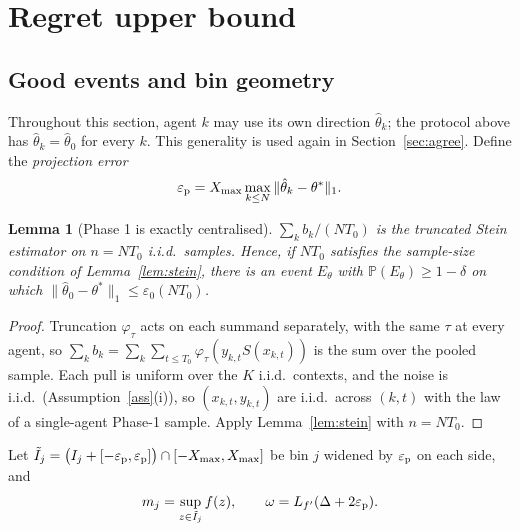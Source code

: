 \documentclass[11pt]{article}
\newtheorem{lemma}[theorem]{Lemma}
\theoremstyle{definition}
\newcommand{\Prob}{\mathbb{P}}
\newcommand{\Xmax}{X_{\max}}
\newcommand{\eps}{\varepsilon}
\begin{document}
\section{Regret upper bound}\label{sec:regret}

\subsection{Good events and bin geometry}

Throughout this section, agent $k$ may use its own direction $\hat\theta_k$; the protocol above has
$\hat\theta_k=\hat\theta_0$ for every $k$. This generality is used again in Section~\ref{sec:agree}. Define the
\emph{projection error}
\[
\eps_{\rm p}=\Xmax\max_{k\le N}\|\hat\theta_k-\theta^*\|_1 .
\]

\begin{lemma}[Phase 1 is exactly centralised]\label{lem:exact}
$\sum_kb_k/(NT_0)$ is the truncated Stein estimator on $n=NT_0$ i.i.d.\ samples. Hence, if $NT_0$ satisfies the
sample-size condition of Lemma~\ref{lem:stein}, there is an event $E_\theta$ with $\Prob(E_\theta)\ge1-\delta$ on which
$\|\hat\theta_0-\theta^*\|_1\le\eps_0(NT_0)$.
\end{lemma}
\begin{proof}
Truncation $\varphi_\tau$ acts on each summand separately, with the same $\tau$ at every agent, so
$\sum_kb_k=\sum_{k}\sum_{t\le T_0}\varphi_\tau(y_{k,t}S(x_{k,t}))$ is the sum over the pooled sample. Each pull is
uniform over the $K$ i.i.d.\ contexts, and the noise is i.i.d.\ (Assumption~\ref{ass}(i)), so $(x_{k,t},y_{k,t})$ are
i.i.d.\ across $(k,t)$ with the law of a single-agent Phase-1 sample. Apply Lemma~\ref{lem:stein} with $n=NT_0$.
\end{proof}

Let $\tilde I_j=\big(I_j+[-\eps_{\rm p},\eps_{\rm p}]\big)\cap[-\Xmax,\Xmax]$ be bin $j$ widened by $\eps_{\rm p}$ on
each side, and
\[
m_j=\sup_{z\in\tilde I_j}f(z),\qquad \omega=L_{f'}(\Delta+2\eps_{\rm p}).
\]
\end{document}
